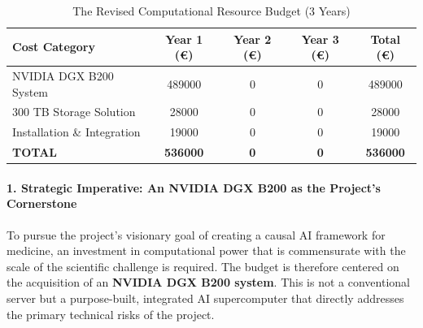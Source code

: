\documentclass[11pt, a4paper]{article}
\begin{document}
\begin{table}[H]
\centering
\caption{The Revised Computational Resource Budget (3 Years)}
\label{tab:computational_budget}
\begin{tabular}{lS[table-format=6.0]S[table-format=6.0]S[table-format=6.0]S[table-format=6.0]}
\toprule
\textbf{Cost Category} & {\textbf{Year 1 (€)}} & {\textbf{Year 2 (€)}} & {\textbf{Year 3 (€)}} & {\textbf{Total (€)}} \\
\midrule
NVIDIA DGX B200 System & 489000 & 0 & 0 & 489000 \\
300 TB Storage Solution & 28000 & 0 & 0 & 28000 \\
Installation \& Integration & 19000 & 0 & 0 & 19000 \\
\midrule
\textbf{TOTAL} & \textbf{536000} & \textbf{0} & \textbf{0} & \textbf{536000} \\
\bottomrule
\end{tabular}
\end{table}

\paragraph{1. Strategic Imperative: An NVIDIA DGX B200 as the Project's Cornerstone}
To pursue the project's visionary goal of creating a causal AI framework for medicine, an investment in computational power that is commensurate with the scale of the scientific challenge is required. The budget is therefore centered on the acquisition of an \textbf{NVIDIA DGX B200 system}. This is not a conventional server but a purpose-built, integrated AI supercomputer that directly addresses the primary technical risks of the project.
\end{document}
